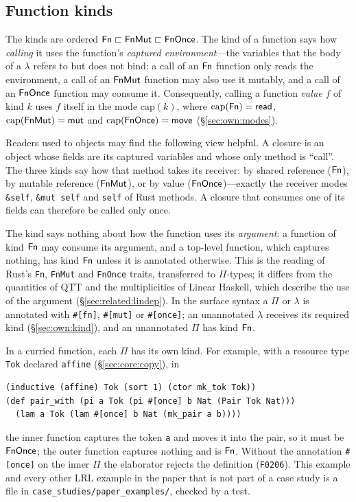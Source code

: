 \subsection{Function kinds}\label{sec:core:kinds}

\begin{definition}\label{def:kinds}
The kinds are ordered $\mathsf{Fn} \sqsubset \mathsf{FnMut} \sqsubset \mathsf{FnOnce}$.
The kind of a function says how \emph{calling} it uses the function's \emph{captured environment}---the variables that the body of a $\lambda$ refers to but does not bind:
a call of an $\mathsf{Fn}$ function only reads the environment, a call of an $\mathsf{FnMut}$ function may also use it mutably, and a call of an $\mathsf{FnOnce}$ function may consume it.
Consequently, calling a function \emph{value} $f$ of kind $k$ uses $f$ itself in the mode $\mathrm{cap}(k)$, where $\mathrm{cap}(\mathsf{Fn})=\mathsf{read}$, $\mathrm{cap}(\mathsf{FnMut})=\mathsf{mut}$ and $\mathrm{cap}(\mathsf{FnOnce})=\mathsf{move}$ (\S\ref{sec:own:modes}).
\end{definition}

Readers used to objects may find the following view helpful.
A closure is an object whose fields are its captured variables and whose only method is ``call''.
The three kinds say how that method takes its receiver: by shared reference ($\mathsf{Fn}$), by mutable reference ($\mathsf{FnMut}$), or by value ($\mathsf{FnOnce}$)---exactly the receiver modes \lstinline|&self|, \lstinline|&mut self| and \lstinline|self| of Rust methods.
A closure that consumes one of its fields can therefore be called only once.

The kind says nothing about how the function uses its \emph{argument}: a function of kind $\mathsf{Fn}$ may consume its argument, and a top-level function, which captures nothing, has kind $\mathsf{Fn}$ unless it is annotated otherwise.
This is the reading of Rust's \lstinline|Fn|, \lstinline|FnMut| and \lstinline|FnOnce| traits, transferred to $\Pi$-types; it differs from the quantities of QTT and the multiplicities of Linear Haskell, which describe the use of the argument (\S\ref{sec:related:lindep}).
In the surface syntax a $\Pi$ or $\lambda$ is annotated with \lstinline|#[fn]|, \lstinline|#[mut]| or \lstinline|#[once]|; an unannotated $\lambda$ receives its required kind (\S\ref{sec:own:kind}), and an unannotated $\Pi$ has kind $\mathsf{Fn}$.

In a curried function, each $\Pi$ has its own kind.
For example, with a resource type \lstinline|Tok| declared \lstinline|affine| (\S\ref{sec:core:copy}), in
\begin{lstlisting}
(inductive (affine) Tok (sort 1) (ctor mk_tok Tok))
(def pair_with (pi a Tok (pi #[once] b Nat (Pair Tok Nat)))
  (lam a Tok (lam #[once] b Nat (mk_pair a b))))
\end{lstlisting}
the inner function captures the token \lstinline|a| and moves it into the pair, so it must be $\mathsf{FnOnce}$; the outer function captures nothing and is $\mathsf{Fn}$.
Without the annotation \lstinline|#[once]| on the inner $\Pi$ the elaborator rejects the definition (\texttt{F0206}).
This example and every other LRL example in the paper that is not part of a case study is a file in \texttt{case\_studies/paper\_examples/}, checked by a test.

